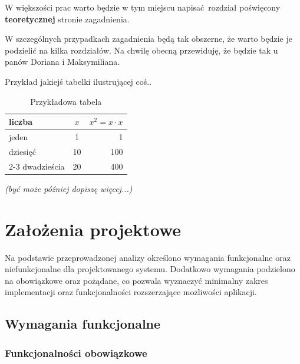 \documentclass[12pt]{book}
\begin{document}
W większości prac warto będzie
w tym miejscu 
napisać rozdział 
poświęcony \textbf{teoretycznej}
stronie zagadnienia.

W szczególnych przypadkach 
zagadnienia będą tak obszerne,
że warto będzie je podzielić
na kilka rozdziałów.
Na chwilę obecną przewiduję, że będzie
tak u panów Doriana i Maksymiliana.


Przykład jakiejś tabelki ilustrującej coś..
\begin{table}[htbp]\small
	\caption{Przykładowa tabela}
	\label{sample-table}
	\begin{center}
		\begin{tabular}{|l|c|r|}
			\hline
			liczba & $x$ & $x^2 = x \cdot x$\\\hline\hline
			jeden& 1 & 1  \\\hline
			dziesięć & 10 & 100  \\\cline{2-3}
			dwadzieścia & 20 & 400   \\\hline
		\end{tabular}
	\end{center}
\end{table}


\textit{(być może później dopiszę więcej...)}


\chapter{Założenia projektowe}

Na podstawie przeprowadzonej analizy określono wymagania funkcjonalne oraz niefunkcjonalne dla projektowanego systemu.
Dodatkowo wymagania podzielono na obowiązkowe oraz pożądane, co pozwala wyznaczyć minimalny zakres implementacji
oraz funkcjonalności rozszerzające możliwości aplikacji.

\section{Wymagania funkcjonalne}

\subsection{Funkcjonalności obowiązkowe}
\end{document}
